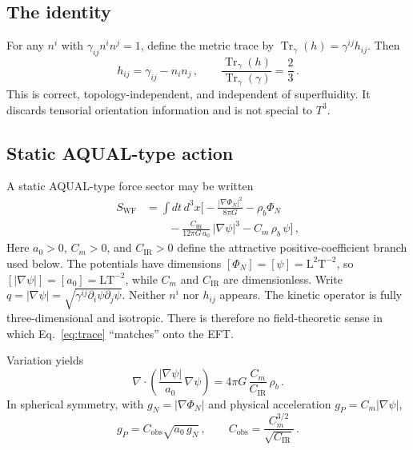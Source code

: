 \documentclass[aps,prd,reprint,superscriptaddress,nofootinbib,floatfix,showkeys]{revtex4-2}
\newcommand{\Tthree}{T^{3}}
\newcommand{\Cobs}{C_{\mathrm{obs}}}
\newcommand{\Cm}{C_{m}}
\newcommand{\CIR}{C_{\mathrm{IR}}}
\newcommand{\azero}{a_{0}}
\begin{document}
\subsection{The identity}

For any \(n^{i}\) with \(\gamma_{ij}n^i n^j=1\), define the metric
trace by \(\operatorname{Tr}_{\gamma}(h)=\gamma^{ij}h_{ij}\). Then
\begin{equation}
  h_{ij}=\gamma_{ij}-n_{i}n_{j}\,,
  \qquad
  \frac{\operatorname{Tr}_{\gamma}(h)}{\operatorname{Tr}_{\gamma}(\gamma)}
  =\frac{2}{3}\,.
  \label{eq:trace}
\end{equation}
This is correct, topology-independent, and independent of superfluidity.  It
discards tensorial orientation information and is not special to \(\Tthree\).

\subsection{Static AQUAL-type action}

A static AQUAL-type force sector \cite{bekenstein_milgrom} may be written
\begin{align}
  S_{\mathrm{WF}}
  &= \int\! dt\,d^{3}x
  \Biggl[
  -\frac{|\nabla\Phi_{N}|^{2}}{8\pi G}
  - \rho_{b}\Phi_{N}
  \nonumber\\
  &\qquad
  - \frac{\CIR}{12\pi G\,\azero}\,|\nabla\psi|^{3}
  - \Cm\,\rho_{b}\,\psi
  \Biggr]\,,
  \label{eq:SWF}
\end{align}
Here \(\azero>0\), \(\Cm>0\), and \(\CIR>0\) define the attractive
positive-coefficient branch used below. The potentials have dimensions
\([\Phi_N]=[\psi]=\mathrm{L}^2\mathrm{T}^{-2}\), so
\([|\nabla\psi|]=[\azero]=\mathrm{L}\mathrm{T}^{-2}\), while \(\Cm\)
and \(\CIR\) are dimensionless. Write
\(q=|\nabla\psi|=\sqrt{\gamma^{ij}\partial_{i}\psi\partial_{j}\psi}\).
Neither \(n^{i}\) nor \(h_{ij}\) appears.  The kinetic operator is fully
three-dimensional and isotropic.  There is therefore no field-theoretic sense
in which Eq.~\eqref{eq:trace} ``matches'' onto the EFT.

Variation yields
\begin{equation}
  \nabla\cdot\!\left(\frac{|\nabla\psi|}{\azero}\,\nabla\psi\right)
  = 4\pi G\,\frac{\Cm}{\CIR}\,\rho_{b}\,.
  \label{eq:p3}
\end{equation}
In spherical symmetry, with \(g_{N}=|\nabla\Phi_{N}|\) and physical
acceleration \(g_{P}=\Cm|\nabla\psi|\),
\begin{equation}
  g_{P} = \Cobs\sqrt{\azero\,g_{N}}\,,
  \qquad
  \boxed{
  \Cobs = \frac{\Cm^{3/2}}{\sqrt{\CIR}}
  }\,.
  \label{eq:Cobs}
\end{equation}
\end{document}
